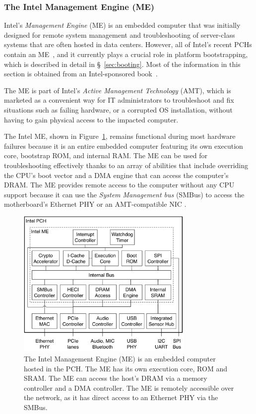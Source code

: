 \subsubsection{The Intel Management Engine (ME)}
\label{sec:intel_me}

Intel's \textit{Management Engine} (ME) is an embedded computer that was
initially designed for remote system management and troubleshooting of
server-class systems that are often hosted in data centers. However, all of
Intel's recent PCHs contain an ME~\cite{intel2013mefw}, and it currently plays
a crucial role in platform bootstrapping, which is described in detail in
\S~\ref{sec:booting}. Most of the information in this section is obtained from
an Intel-sponsored book~\cite{ruan2014intelme}.

The ME is part of Intel's \textit{Active Management Technology} (AMT), which is
marketed as a convenient way for IT administrators to troubleshoot and fix
situations such as failing hardware, or a corrupted OS installation, without
having to gain physical access to the impacted computer.

The Intel ME, shown in Figure~\ref{fig:intel_me}, remains functional during
most hardware failures because it is an entire embedded computer featuring its
own execution core, bootstrap ROM, and internal RAM. The ME can be used for
troubleshooting effectively thanks to an array of abilities that include
overriding the CPU's boot vector and a DMA engine that can access the
computer's DRAM. The ME provides remote access to the computer without any CPU
support because it can use the \textit{System Management bus} (SMBus) to access
the motherboard's Ethernet PHY or an AMT-compatible NIC
\cite{intel2015chipset}.

\begin{figure}[hbt]
  \centering
  \includegraphics[width=85mm]{figures/intel_me.pdf}
  \caption{
    The Intel Management Engine (ME) is an embedded computer hosted in the
    PCH. The ME has its own execution core, ROM and SRAM. The ME can access the
    host's DRAM via a memory controller and a DMA controller. The ME is
    remotely accessible over the network, as it has direct access to an
    Ethernet PHY via the SMBus.
  }
  \label{fig:intel_me}
\end{figure}

